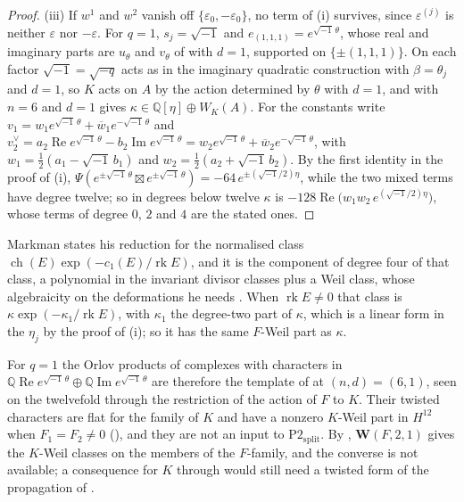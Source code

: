 \documentclass[11pt,reqno]{amsart}
\theoremstyle{plain}
\theoremstyle{definition}
\theoremstyle{remark}
\newcommand{\QQ}{\mathbb{Q}}
\DeclareMathOperator{\ch}{ch}
\DeclareMathOperator{\rk}{rk}
\newcommand{\bbar}[1]{\overline{#1}}
\begin{document}
\begin{proof}
(iii) If $w^{1}$ and $w^{2}$ vanish off $\{\varepsilon_{0},-\varepsilon_{0}\}$,
no term of (i) survives, since $\varepsilon^{(j)}$ is neither $\varepsilon$
nor $-\varepsilon$. For $q=1$, $s_{j}=\sqrt{-1}$ and
$e_{(1,1,1)}=e^{\sqrt{-1}\,\theta}$, whose real and imaginary parts are
$u_{\theta}$ and $v_{\theta}$ of \cite[(30)]{paperI} with $d=1$, supported on
$\{\pm(1,1,1)\}$. On each factor $\sqrt{-1}=\sqrt{-q}$ acts as in the
imaginary quadratic construction with $\beta=\theta_{j}$ and $d=1$, so $K$
acts on $A$ by the action \cite[(29)]{paperI} determined by $\theta$ with $d=1$,
and  with $n=6$ and $d=1$ gives
$\kappa\in\QQ[\eta]\oplus W_{K}(A)$. For the constants write
$v_{1}=w_{1}e^{\sqrt{-1}\,\theta}+\bbar w_{1}e^{-\sqrt{-1}\,\theta}$ and
$v_{2}^{\vee}=a_{2}\operatorname{Re}e^{\sqrt{-1}\,\theta}
-b_{2}\operatorname{Im}e^{\sqrt{-1}\,\theta}
=w_{2}e^{\sqrt{-1}\,\theta}+\bbar w_{2}e^{-\sqrt{-1}\,\theta}$, with
$w_{1}=\frac12(a_{1}-\sqrt{-1}\,b_{1})$ and $w_{2}=\frac12(a_{2}+\sqrt{-1}\,
b_{2})$. By the first identity in the proof of (i),
$\Psi(e^{\pm\sqrt{-1}\,\theta}\boxtimes e^{\pm\sqrt{-1}\,\theta})
=-64\,e^{\pm(\sqrt{-1}/2)\eta}$, while the two mixed terms have degree
twelve; so in degrees below twelve $\kappa$ is
$-128\operatorname{Re}\bigl(w_{1}w_{2}\,e^{(\sqrt{-1}/2)\eta}\bigr)$, whose
terms of degree $0$, $2$ and $4$ are the stated ones.
\end{proof}

Markman states his reduction for the normalised class
$\ch(E)\exp(-c_{1}(E)/\rk E)$, and it is the component of degree four of that
class, a polynomial in the invariant divisor classes plus a Weil class, whose
algebraicity on the deformations he needs \cite[Proposition~10.2.1,
Corollary~10.2.3]{Mar25c}. When $\rk E\ne0$ that class is
$\kappa\exp(-\kappa_{1}/\rk E)$, with $\kappa_{1}$ the degree-two part of
$\kappa$, which is a linear form in the $\eta_{j}$ by the proof of
(i); so it has the same $F$-Weil part as $\kappa$.

For $q=1$ the Orlov products of complexes with characters in
$\QQ\operatorname{Re}e^{\sqrt{-1}\,\theta}\oplus\QQ\operatorname{Im}
e^{\sqrt{-1}\,\theta}$ are therefore the template of
 at $(n,d)=(6,1)$, seen on the twelvefold through the
restriction of the action of $F$ to $K$. Their twisted characters are flat
for the family of $K$ and have a nonzero $K$-Weil part in $H^{12}$ when
$F_{1}=F_{2}\ne0$ (), and they are not an input to
$\mathrm{P2}_{\mathrm{split}}$. By \cite[Proposition~17.10]{paperI}, $\mathbf{W}(F,2,1)$
gives the $K$-Weil classes on the members of the $F$-family, and the converse
is not available; a consequence for $K$ through \cite[Proposition~2.13]{paperIII} would
still need a twisted form of the propagation of .
\end{document}
